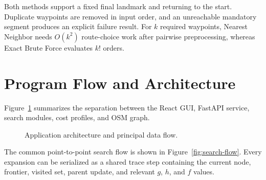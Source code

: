 \documentclass[12pt,a4paper]{article}
\begin{document}
Both methods support a fixed final landmark and returning to the start.
Duplicate waypoints are removed in input order, and an unreachable mandatory
segment produces an explicit failure result. For $k$ required waypoints,
Nearest Neighbor needs $O(k^2)$ route-choice work after pairwise preprocessing,
whereas Exact Brute Force evaluates $k!$ orders.

\section{Program Flow and Architecture}

Figure~\ref{fig:architecture} summarizes the separation between the React GUI,
FastAPI service, search modules, cost profiles, and OSM graph.

\begin{figure}[H]
    \centering
    \caption{Application architecture and principal data flow.}
    \label{fig:architecture}
\end{figure}

The common point-to-point search flow is shown in
Figure~\ref{fig:search-flow}. Every expansion can be serialized as a shared
trace step containing the current node, frontier, visited set, parent update,
and relevant $g$, $h$, and $f$ values.
\end{document}
